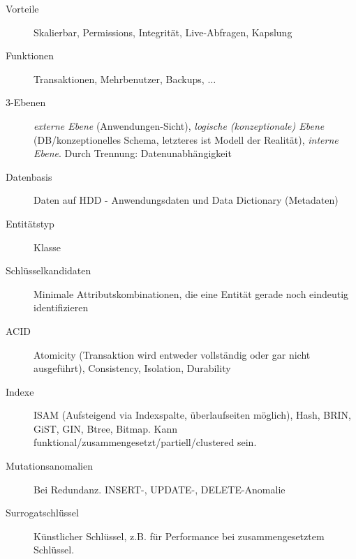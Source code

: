 \begin{multicols*}{3}
\begin{description}
\item[Vorteile]{Skalierbar, Permissions, Integrität, Live-Abfragen, Kapslung}
\item[Funktionen]{Transaktionen, Mehrbenutzer, Backups, $\ldots$}
\item[3-Ebenen]{\emph{externe Ebene} (Anwendungen-Sicht), \emph{logische (konzeptionale) Ebene}
    (DB/konzeptionelles Schema, letzteres ist Modell der Realität), \emph{interne
    Ebene}. Durch Trennung: Datenunabhängigkeit}
\item[Datenbasis]{Daten auf HDD - Anwendungsdaten und Data Dictionary (Metadaten)}
\item[Entitätstyp]{Klasse}
\item[Schlüsselkandidaten]{Minimale Attributskombinationen, die eine Entität
    gerade noch eindeutig identifizieren}
\item[ACID]{Atomicity (Transaktion wird entweder vollständig oder gar nicht ausgeführt), Consistency, Isolation, Durability}
\item[Indexe]{ISAM (Aufsteigend via Indexspalte, überlaufseiten möglich), Hash, BRIN, GiST, GIN, Btree, Bitmap. Kann funktional/zusammengesetzt/partiell/clustered sein.}
\item[Mutationsanomalien]{Bei Redundanz. INSERT-, UPDATE-, DELETE-Anomalie}
\item[Surrogatschlüssel]{Künstlicher Schlüssel, z.B. für Performance bei
    zusammengesetztem Schlüssel}.
\end{description}


\end{multicols*}

